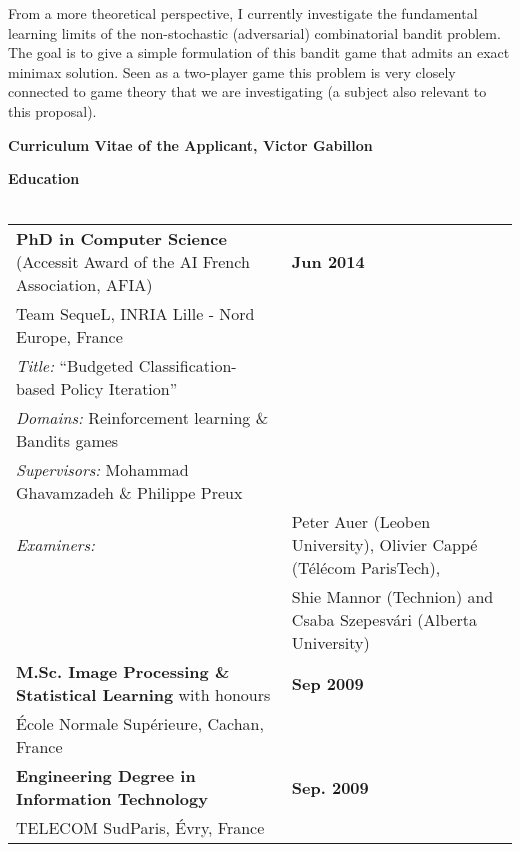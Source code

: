 From a more theoretical perspective, I currently investigate the fundamental learning limits of the non-stochastic (adversarial) combinatorial bandit problem. The goal is to give a simple formulation of this bandit game that admits an exact minimax solution. Seen as a two-player game this problem is very closely connected to game theory that we are investigating (a subject also relevant to this proposal).


 \begin{center} \textbf{Curriculum Vitae of the Applicant,  Victor Gabillon}  \end{center}
 
\noindent\textbf{Education}\\[-.4cm]\noindent\makebox[\linewidth]{\rule{\columnwidth}{0.4pt}}\\[.1cm]
\noindent\begin{tabularx}{\columnwidth}{@{} l X @{}}
\noindent\textbf{PhD in Computer Science} (Accessit Award of the AI French Association, AFIA)& \hfill \textbf{Jun 2014} \\
Team SequeL, INRIA Lille - Nord Europe, France\\
\textit{Title:} ``Budgeted Classification-based Policy Iteration''\\
\textit{Domains:} Reinforcement learning \& Bandits games\\
\textit{Supervisors:}  Mohammad Ghavamzadeh \&  Philippe Preux\\
\noindent\textit{Examiners:}\begin{tabular}{ll}  &Peter Auer (Leoben University), Olivier Cappé   (Télécom ParisTech), \\
\noindent & Shie Mannor   (Technion)  and Csaba Szepesvári  (Alberta  University)  
\end{tabular}\\[.2cm]
\textbf{M.Sc. Image Processing \& Statistical Learning} with honours &\hfill \textbf{ Sep 2009}\\
 École Normale Supérieure, Cachan, France\\[.2cm]
\textbf{Engineering Degree in Information Technology}  &\hfill \textbf{ Sep. 2009}\\
 TELECOM SudParis, Évry, France
\end{tabularx}\\[.2cm]

